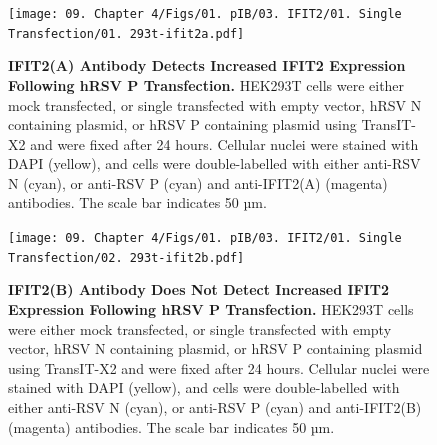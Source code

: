 \begin{figure}
    \centering
    \texttt{[image: 09. Chapter 4/Figs/01. pIB/03. IFIT2/01. Single Transfection/01. 293t-ifit2a.pdf]}
    \caption[IFIT2(A) Antibody Detects Increased IFIT2 Expression Following hRSV P Transfection.]{\textbf{IFIT2(A) Antibody Detects Increased IFIT2 Expression Following hRSV P Transfection.} HEK293T cells were either mock transfected, or single transfected with empty vector, hRSV N containing plasmid, or hRSV P containing plasmid using TransIT-X2 and were fixed after 24 hours. Cellular nuclei were stained with DAPI (yellow), and cells were double-labelled with either anti-RSV N (cyan), or anti-RSV P (cyan) and anti-IFIT2(A) (magenta) antibodies. The scale bar indicates 50 µm.}
    \label{fig:IFIT2(A) Antibody Detects Increased IFIT2 Expression Following hRSV P Transfection}
\end{figure}

\begin{figure}
    \centering
    \texttt{[image: 09. Chapter 4/Figs/01. pIB/03. IFIT2/01. Single Transfection/02. 293t-ifit2b.pdf]}
    \caption[IFIT2(B) Antibody Does Not Detect Increased IFIT2 Expression Following hRSV P Transfection.]{\textbf{IFIT2(B) Antibody Does Not Detect Increased IFIT2 Expression Following hRSV P Transfection.} HEK293T cells were either mock transfected, or single transfected with empty vector, hRSV N containing plasmid, or hRSV P containing plasmid using TransIT-X2 and were fixed after 24 hours. Cellular nuclei were stained with DAPI (yellow), and cells were double-labelled with either anti-RSV N (cyan), or anti-RSV P (cyan) and anti-IFIT2(B) (magenta) antibodies. The scale bar indicates 50 µm.}
    \label{fig:IFIT2(B) Antibody Does Not Detect Increased IFIT2 Expression Following hRSV P Transfection}
\end{figure}


